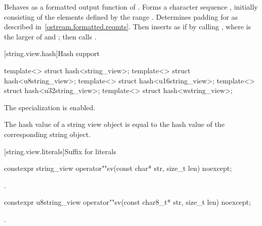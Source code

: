 \begin{itemdescr}
\pnum
\effects
Behaves as a formatted output
function of . Forms a character sequence
, initially consisting of the elements defined by the range
. Determines padding for 
as described in~\ref{ostream.formatted.reqmts}.
Then inserts  as if by calling
, where  is the larger
of  and ;
then calls .

\pnum
\returns
{}
\end{itemdescr}

[string.view.hash]{Hash support}

%
%
%
%
%
\begin{itemdecl}
template<> struct hash<string_view>;
template<> struct hash<u8string_view>;
template<> struct hash<u16string_view>;
template<> struct hash<u32string_view>;
template<> struct hash<wstring_view>;
\end{itemdecl}

\begin{itemdescr}
\pnum
The specialization is enabled.
\begin{note}
The hash value of a string view object is equal to the hash value of
the corresponding string object.
\end{note}
\end{itemdescr}

[string.view.literals]{Suffix for  literals}

%
\begin{itemdecl}
constexpr string_view operator""sv(const char* str, size_t len) noexcept;
\end{itemdecl}

\begin{itemdescr}
\pnum
\returns
{}.
\end{itemdescr}

%
\begin{itemdecl}
constexpr u8string_view operator""sv(const char8_t* str, size_t len) noexcept;
\end{itemdecl}
\begin{itemdescr}
\pnum
\returns
{}.
\end{itemdescr}

